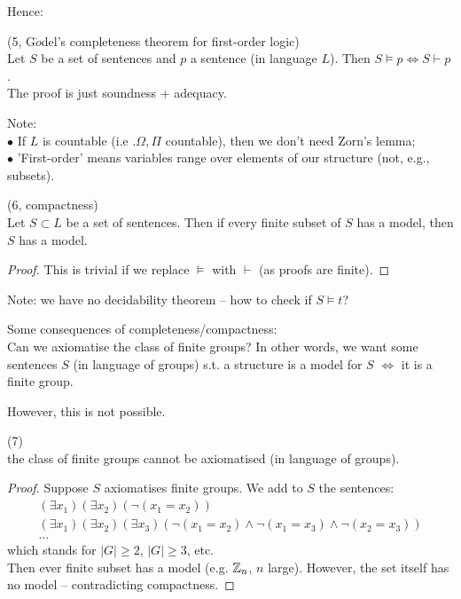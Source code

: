 \documentclass[a4paper]{article}
\begin{document}
Hence:
\begin{thm} (5, G$\ddot{o}$del's completeness theorem for first-order logic)\\
Let $S$ be a set of sentences and $p$ a sentence (in language $L$). Then $S \vDash p \iff S \vdash p$.\\
The proof is just soundness + adequacy.
\end{thm}

Note:\\
$\bullet$ If $L$ is countable (i.e .$\Omega,\Pi$ countable), then we don't need Zorn's lemma;\\
$\bullet$ 'First-order' means variables range over elements of our structure (not, e.g., subsets).

\begin{thm} (6, compactness)\\
Let $S \subset L$ be a set of sentences. Then if every finite subset of $S$ has a model, then $S$ has a model.
\begin{proof}
This is trivial if we replace $\vDash$ with $\vdash$ (as proofs are finite).
\end{proof}
\end{thm}

Note: we have no decidability theorem -- how to check if $S \vDash t$?

Some consequences of completeness/compactness:\\
Can we axiomatise the class of finite groups? In other words, we want some sentences $S$ (in language of groups) s.t. a structure is a model for $S$ $\iff$ it is a finite group.

However, this is not possible.

\begin{coro} (7)\\
the class of finite groups cannot be axiomatised (in language of groups).
\begin{proof}
Suppose $S$ axiomatises finite groups. We add to $S$ the sentences:
\begin{equation*}
\begin{aligned}
(\exists x_1) (\exists x_2) (\neg (x_1 =x_2))\\
(\exists x_1) (\exists x_2) (\exists x_3) (\neg (x_1 = x_2) \wedge \neg(x_1 = x_3) \wedge \neg(x_2 = x_3))\\
...
\end{aligned}
\end{equation*}
which stands for $|G| \geq 2$, $|G| \geq 3$, etc.\\
Then ever finite subset has a model (e.g. $\mathbb{Z}_n$, $n$ large). However, the set itself has no model -- contradicting compactness.
\end{proof}
\end{coro}
\end{document}

